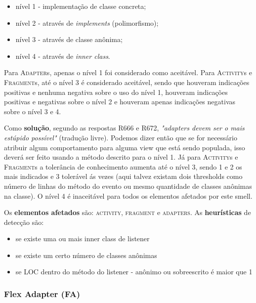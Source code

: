 \begin{itemize} 
	\item[$\circ$] n\'ivel 1 - implementa\c{c}\~ao de classe concreta;
	\item[$\circ$] n\'ivel 2 - atrav\'es de \textit{implements} (polimorfismo);
	\item[$\circ$] n\'ivel 3 - atrav\'es de classe an\^onima;
	\item[$\circ$] n\'ivel 4 - atrav\'es de \textit{inner class}.
\end{itemize}

Para \textsc{Adapter}s, apenas o n\'ivel 1 foi considerado como aceit\'avel. Para \textsc{Activity}s e \textsc{Fragment}s, at\'e o n\'ivel 3 \'e considerado aceit\'avel, sendo que houveram indica\c{c}\~oes positivas e nenhuma negativa sobre o uso do n\'ivel 1, houveram indica\c{c}\~oes positivas e negativas sobre o n\'ivel 2 e houveram apenas indica\c{c}\~oes negativas sobre o n\'ivel 3 e 4. 

Como \textbf{solu\c{c}\~ao}, segundo as respostas R666 e R672, \textit{"adapters devem ser o mais est\'upido poss\'ivel"} (tradu\c{c}\~ao livre). Podemos dizer ent\~ao que se for necess\'ario atribuir algum comportamento para alguma view que est\'a sendo populada, isso dever\'a ser feito usando a m\'etodo descrito para o n\'ivel 1. J\'a para \textsc{Activity}s e \textsc{Fragment}s a toler\^ancia de conhecimento aumenta at\'e o n\'ivel 3, sendo 1 e 2 os mais indicados e 3 toler\'avel \'as vezes (aqui talvez existam dois thresholds como n\'umero de linhas do m\'etodo do evento ou mesmo quantidade de classes an\^onimas na classe). O n\'ivel 4 \'e inaceit\'avel para todos os elementos afetados por este smell.

Os \textbf{elementos afetados} s\~ao: \textsc{activity}, \textsc{fragment} e \textsc{adapters}. As \textbf{heur\'isticas} de detec\c{c}\~ao s\~ao:

\begin{itemize} 
	\item[$\circ$] [n\'ivel 4] se existe uma ou mais inner class de listener
	\item[$\circ$] [n\'ivel 3] se existe um certo n\'umero de classes an\^onimas
	\item[$\circ$] [n\'ivel 2 e 3] se LOC dentro do m\'etodo do listener - an\^onimo ou sobreescrito \'e maior que 1
\end{itemize}


\subsubsection{Flex Adapter (FA)}


